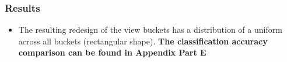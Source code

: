 \documentclass[english]{article}
\begin{document}
\subsubsection{Results}
\begin{itemize}
\item The resulting redesign of the view buckets has a distribution of a uniform across all buckets (rectangular shape).
\bf{The classification accuracy comparison can be found in Appendix Part E}

\end{itemize}
\end{document}
